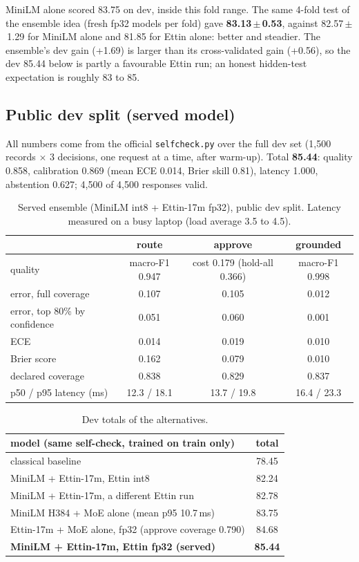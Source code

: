 \documentclass[11pt,a4paper]{article}
\begin{document}
MiniLM alone scored 83.75 on dev, inside this fold range. The same 4-fold test
of the ensemble idea (fresh fp32 models per fold) gave \textbf{83.13\,$\pm$\,0.53},
against 82.57\,$\pm$\,1.29 for MiniLM alone and 81.85 for Ettin alone: better
and steadier. The ensemble's dev gain (+1.69) is larger than its cross-validated
gain (+0.56), so the dev 85.44 below is partly a favourable Ettin run; an honest
hidden-test expectation is roughly 83 to 85.

\subsection{Public dev split (served model)}

All numbers come from the official \texttt{selfcheck.py} over the full dev set
(1{,}500 records $\times$ 3 decisions, one request at a time, after warm-up).
Total \textbf{85.44}: quality 0.858, calibration 0.869 (mean ECE 0.014, Brier
skill 0.81), latency 1.000, abstention 0.627; 4{,}500 of 4{,}500 responses valid.

\begin{table}[h]
\centering
\begin{tabular}{lccc}
\toprule
 & route & approve & grounded \\
\midrule
quality & macro-F1 0.947 & cost 0.179 (hold-all 0.366) & macro-F1 0.998 \\
error, full coverage & 0.107 & 0.105 & 0.012 \\
error, top 80\% by confidence & 0.051 & 0.060 & 0.001 \\
ECE & 0.014 & 0.019 & 0.010 \\
Brier score & 0.162 & 0.079 & 0.010 \\
declared coverage & 0.838 & 0.829 & 0.837 \\
p50 / p95 latency (ms) & 12.3 / 18.1 & 13.7 / 19.8 & 16.4 / 23.3 \\
\bottomrule
\end{tabular}
\caption{Served ensemble (MiniLM int8 + Ettin-17m fp32), public dev split.
Latency measured on a busy laptop (load average 3.5 to 4.5).}
\end{table}

\begin{table}[h]
\centering
\begin{tabular}{lc}
\toprule
model (same self-check, trained on train only) & total \\
\midrule
classical baseline & 78.45 \\
MiniLM + Ettin-17m, Ettin int8 & 82.24 \\
MiniLM + Ettin-17m, a different Ettin run & 82.78 \\
MiniLM H384 + MoE alone (mean p95 10.7\,ms) & 83.75 \\
Ettin-17m + MoE alone, fp32 (approve coverage 0.790) & 84.68 \\
\textbf{MiniLM + Ettin-17m, Ettin fp32 (served)} & \textbf{85.44} \\
\bottomrule
\end{tabular}
\caption{Dev totals of the alternatives.}
\end{table}
\end{document}
